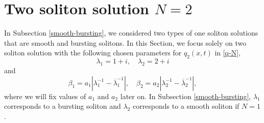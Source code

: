 \documentclass[11pt]{article}
\begin{document}







\section{Two soliton solution $N=2$} \label{two-soliton-example}
In Subsection \ref{smooth-bursting}, we considered two types of one soliton solutions that are smooth and bursting solitons. In this Section, we focus solely on two soliton solution with the following chosen parameters for $q_2(x,t)$ in \eqref{q-N}, 
$$
\lambda_1=1+i, \quad \lambda_2=2+i
$$
and 
\begin{equation} \label{beta}
\beta_1=a_1|\lambda_1^{-1}-\overline{\lambda}_1^{-1}|, \quad \beta_2=a_2|\lambda_2^{-1}-\overline{\lambda}_2^{-1}|, 
\end{equation}
where
we will fix values of $a_1$ and $a_2$ later on. In Subsection \ref{smooth-bursting}, $\lambda_1$ corresponds to a bursting soliton and $\lambda_2$ corresponds to a smooth soliton if $N=1$.  
\end{document}
